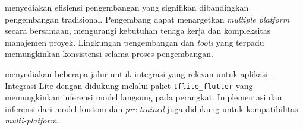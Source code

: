 \flutter{} menyediakan efisiensi pengembangan yang signifikan dibandingkan pengembangan tradisional. Pengembang dapat menargetkan \emph{multiple platform} secara bersamaan, mengurangi kebutuhan tenaga kerja dan kompleksitas manajemen proyek. Lingkungan pengembangan dan \emph{tools} yang terpadu memungkinkan konsistensi selama proses pengembangan.



\flutter{} menyediakan beberapa jalur untuk integrasi \ml{} yang relevan untuk aplikasi \cv{}. Integrasi \tensorflow Lite dengan \flutter{} didukung melalui paket \texttt{tflite\_flutter} yang memungkinkan inferensi model langsung pada perangkat. Implementasi dan inferensi dari model kustom dan \emph{pre-trained} juga didukung untuk kompatibilitas \emph{multi-platform}.

